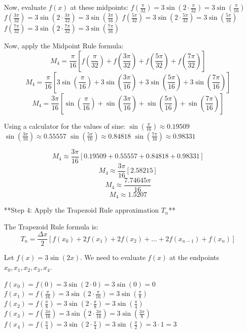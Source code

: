 \documentclass{article}
\begin{document}
Now, evaluate $f(x)$ at these midpoints:
$f\left(\frac{\pi}{32}\right) = 3\sin\left(2 \cdot \frac{\pi}{32}\right) = 3\sin\left(\frac{\pi}{16}\right)$
$f\left(\frac{3\pi}{32}\right) = 3\sin\left(2 \cdot \frac{3\pi}{32}\right) = 3\sin\left(\frac{3\pi}{16}\right)$
$f\left(\frac{5\pi}{32}\right) = 3\sin\left(2 \cdot \frac{5\pi}{32}\right) = 3\sin\left(\frac{5\pi}{16}\right)$
$f\left(\frac{7\pi}{32}\right) = 3\sin\left(2 \cdot \frac{7\pi}{32}\right) = 3\sin\left(\frac{7\pi}{16}\right)$

Now, apply the Midpoint Rule formula:
$$ M_4 = \frac{\pi}{16} \left[ f\left(\frac{\pi}{32}\right) + f\left(\frac{3\pi}{32}\right) + f\left(\frac{5\pi}{32}\right) + f\left(\frac{7\pi}{32}\right) \right] $$
$$ M_4 = \frac{\pi}{16} \left[ 3\sin\left(\frac{\pi}{16}\right) + 3\sin\left(\frac{3\pi}{16}\right) + 3\sin\left(\frac{5\pi}{16}\right) + 3\sin\left(\frac{7\pi}{16}\right) \right] $$
$$ M_4 = \frac{3\pi}{16} \left[ \sin\left(\frac{\pi}{16}\right) + \sin\left(\frac{3\pi}{16}\right) + \sin\left(\frac{5\pi}{16}\right) + \sin\left(\frac{7\pi}{16}\right) \right] $$

Using a calculator for the values of sine:
$\sin\left(\frac{\pi}{16}\right) \approx 0.19509$
$\sin\left(\frac{3\pi}{16}\right) \approx 0.55557$
$\sin\left(\frac{5\pi}{16}\right) \approx 0.84818$
$\sin\left(\frac{7\pi}{16}\right) \approx 0.98331$

$$ M_4 \approx \frac{3\pi}{16} [0.19509 + 0.55557 + 0.84818 + 0.98331] $$
$$ M_4 \approx \frac{3\pi}{16} [2.58215] $$
$$ M_4 \approx \frac{7.74645\pi}{16} $$
$$ M_4 \approx 1.5207 $$

**Step 4: Apply the Trapezoid Rule approximation $T_n$**

The Trapezoid Rule formula is:
$$ T_n = \frac{\Delta x}{2} [f(x_0) + 2f(x_1) + 2f(x_2) + \dots + 2f(x_{n-1}) + f(x_n)] $$

Let $f(x) = 3\sin(2x)$. We need to evaluate $f(x)$ at the endpoints $x_0, x_1, x_2, x_3, x_4$.

$f(x_0) = f(0) = 3\sin(2 \cdot 0) = 3\sin(0) = 0$
$f(x_1) = f\left(\frac{\pi}{16}\right) = 3\sin\left(2 \cdot \frac{\pi}{16}\right) = 3\sin\left(\frac{\pi}{8}\right)$
$f(x_2) = f\left(\frac{\pi}{8}\right) = 3\sin\left(2 \cdot \frac{\pi}{8}\right) = 3\sin\left(\frac{\pi}{4}\right)$
$f(x_3) = f\left(\frac{3\pi}{16}\right) = 3\sin\left(2 \cdot \frac{3\pi}{16}\right) = 3\sin\left(\frac{3\pi}{8}\right)$
$f(x_4) = f\left(\frac{\pi}{4}\right) = 3\sin\left(2 \cdot \frac{\pi}{4}\right) = 3\sin\left(\frac{\pi}{2}\right) = 3 \cdot 1 = 3$
\end{document}
